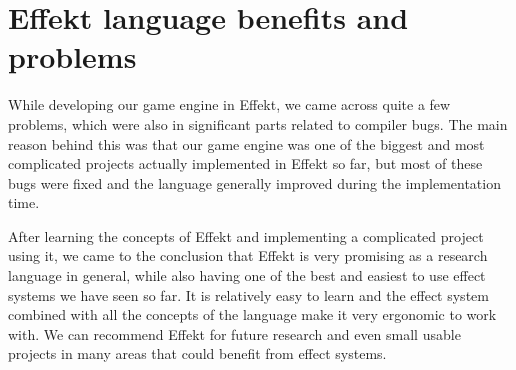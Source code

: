 \section*{Effekt language benefits and problems}

While developing our game engine in Effekt, we came across quite a few problems, which were also in significant parts related to compiler bugs. The main reason behind this was that our game engine was one of the biggest and most complicated projects actually implemented in Effekt so far, but most of these bugs were fixed and the language generally improved during the implementation time.

After learning the concepts of Effekt and implementing a complicated project using it, we came to the conclusion that Effekt is very promising as a research language in general, while also having one of the best and easiest to use effect systems we have seen so far. It is relatively easy to learn and the effect system combined with all the concepts of the language make it very ergonomic to work with. We can recommend Effekt for future research and even small usable projects in many areas that could benefit from effect systems.
